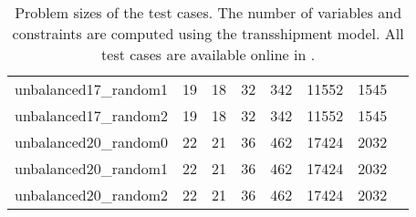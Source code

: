 \begin{table}[ht!]
\begin{adjustbox}{center}
\begin{tabular}{|cccccccc|}
unbalanced17\_random1 & 19 & 18 & 32 & 342 & 11552 & 1545 &  \\ 
unbalanced17\_random2 & 19 & 18 & 32 & 342 & 11552 & 1545 &  \\ 
unbalanced20\_random0 & 22 & 21 & 36 & 462 & 17424 & 2032 &  \\ 
unbalanced20\_random1 & 22 & 21 & 36 & 462 & 17424 & 2032 &  \\ 
unbalanced20\_random2 & 22 & 21 & 36 & 462 & 17424 & 2032 &  \\ 
\hline 
\end{tabular} 
\end{adjustbox} 
\vspace*{-0.2cm} 
\caption{Problem sizes of the test cases. The number of variables and constraints are computed using the transshipment model. All test cases are available online in \cite{source_code}.} 
\label{Table:Problem_Sizes} 
\end{table} 
